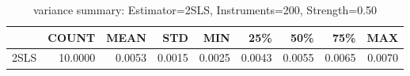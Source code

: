 \begin{table}[ht]
\centering
\caption{variance summary: Estimator=2SLS, Instruments=200, Strength=0.50}
\begin{tabular}{lrrrrrrrr}
\toprule
 & COUNT & MEAN & STD & MIN & 25\% & 50\% & 75\% & MAX \\
\midrule
2SLS & 10.0000 & 0.0053 & 0.0015 & 0.0025 & 0.0043 & 0.0055 & 0.0065 & 0.0070 \\
\bottomrule
\end{tabular}
\end{table}
